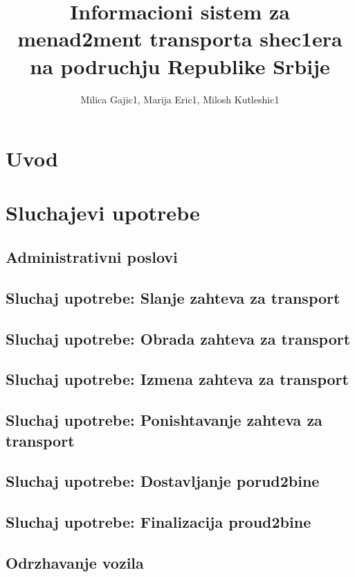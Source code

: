 \documentclass{article}
\title{Informacioni sistem za menad2ment transporta shec1era na podruchju Republike Srbije}
\author{Milica Gajic1, Marija Eric1, Milosh Kutleshic1}
\begin{document}
\maketitle
\newpage


\renewcommand*\contentsname{Sadrz1aj}
\tableofcontents
\newpage

\section{Uvod}

\section{Sluchajevi upotrebe}
\subsection{Administrativni poslovi}



\subsection{Sluchaj upotrebe: Slanje zahteva za transport}


\subsection{Sluchaj upotrebe: Obrada zahteva za transport}


\subsection{Sluchaj upotrebe: Izmena zahteva za transport}


\subsection{Sluchaj upotrebe: Ponishtavanje zahteva za transport}


\subsection{Sluchaj upotrebe: Dostavljanje porud2bine}

\subsection{Sluchaj upotrebe: Finalizacija proud2bine}


\subsection{Odrzhavanje vozila}




\nocite{*}
\selectfont



\end{document}
